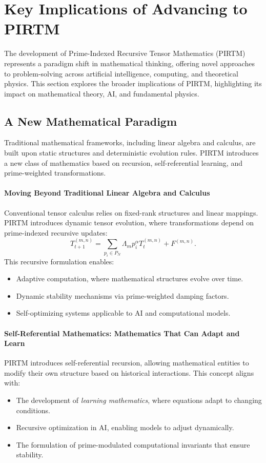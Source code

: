 \documentclass{article}
\theoremstyle{plain}
\begin{document}
\section{Key Implications of Advancing to PIRTM}

The development of Prime-Indexed Recursive Tensor Mathematics (PIRTM) represents a paradigm shift in mathematical thinking, offering novel approaches to problem-solving across artificial intelligence, computing, and theoretical physics. This section explores the broader implications of PIRTM, highlighting its impact on mathematical theory, AI, and fundamental physics.

\subsection{A New Mathematical Paradigm}

Traditional mathematical frameworks, including linear algebra and calculus, are built upon static structures and deterministic evolution rules. PIRTM introduces a new class of mathematics based on recursion, self-referential learning, and prime-weighted transformations.

\paragraph{Moving Beyond Traditional Linear Algebra and Calculus}
Conventional tensor calculus relies on fixed-rank structures and linear mappings. PIRTM introduces dynamic tensor evolution, where transformations depend on prime-indexed recursive updates:
\begin{equation}
    T_{t+1}^{(m,n)} = \sum_{p_i \in P_N} \Lambda_m p_i^\alpha T_t^{(m,n)} + F^{(m,n)}.
\end{equation}
This recursive formulation enables:
\begin{itemize}
    \item Adaptive computation, where mathematical structures evolve over time.
    \item Dynamic stability mechanisms via prime-weighted damping factors.
    \item Self-optimizing systems applicable to AI and computational models.
\end{itemize}

\paragraph{Self-Referential Mathematics: Mathematics That Can Adapt and Learn}
PIRTM introduces self-referential recursion, allowing mathematical entities to modify their own structure based on historical interactions. This concept aligns with:
\begin{itemize}
    \item The development of \textit{learning mathematics}, where equations adapt to changing conditions.
    \item Recursive optimization in AI, enabling models to adjust dynamically.
    \item The formulation of prime-modulated computational invariants that ensure stability.
\end{itemize}
\end{document}
